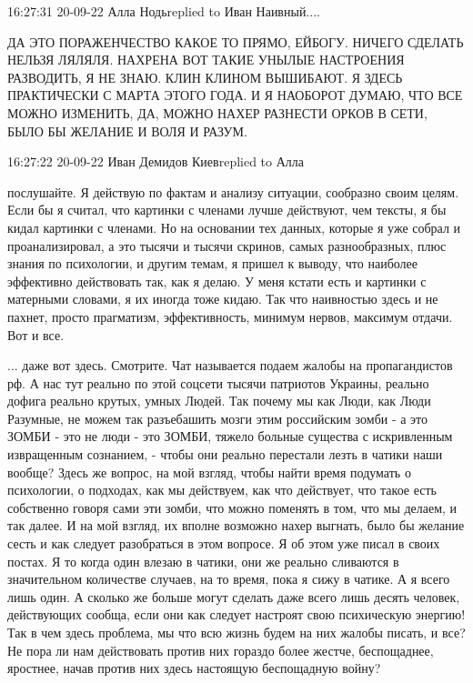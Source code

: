 

16:27:31 20-09-22
Алла Нодьreplied to Иван
Наивный....

ДА ЭТО ПОРАЖЕНЧЕСТВО КАКОЕ ТО ПРЯМО, ЕЙБОГУ. НИЧЕГО СДЕЛАТЬ НЕЛЬЗЯ ЛЯЛЯЛЯ.
НАХРЕНА ВОТ ТАКИЕ УНЫЛЫЕ НАСТРОЕНИЯ РАЗВОДИТЬ, Я НЕ ЗНАЮ. КЛИН КЛИНОМ ВЫШИБАЮТ.
Я ЗДЕСЬ ПРАКТИЧЕСКИ С МАРТА ЭТОГО ГОДА. И Я НАОБОРОТ ДУМАЮ, ЧТО ВСЕ МОЖНО
ИЗМЕНИТЬ, ДА, МОЖНО НАХЕР РАЗНЕСТИ ОРКОВ В СЕТИ, БЫЛО БЫ ЖЕЛАНИЕ И ВОЛЯ И
РАЗУМ.

16:27:22 20-09-22
Иван Демидов Киевreplied to Алла

послушайте. Я действую по фактам и анализу ситуации, сообразно своим целям.
Если бы я считал, что картинки с членами лучше действуют, чем тексты, я бы
кидал картинки с членами. Но на основании тех данных, которые я уже собрал и
проанализировал, а это тысячи и тысячи скринов, самых разнообразных, плюс
знания по психологии, и другим темам, я пришел к выводу, что наиболее
эффективно действовать так, как я делаю. У меня кстати есть и картинки с
матерными словами, я их иногда тоже кидаю. Так что наивностью здесь и не
пахнет, просто прагматизм, эффективность, минимум нервов, максимум отдачи. Вот
и все.

... даже вот здесь. Смотрите. Чат называется подаем жалобы на пропагандистов
рф. А нас тут реально по этой соцсети тысячи патриотов Украины, реально дофига
реально крутых, умных Людей. Так почему мы как Люди, как Люди Разумные, не
можем так разъебашить мозги этим российским зомби - а это ЗОМБИ - это не люди -
это ЗОМБИ, тяжело больные существа с искривленным извращенным сознанием, -
чтобы они реально перестали лезть в чатики наши вообще? Здесь же вопрос, на мой
взгляд, чтобы найти время подумать о психологии, о подходах, как мы действуем,
как что действует, что такое есть собственно говоря сами эти зомби, что можно
поменять в том, что мы делаем, и так далее. И на мой взгляд, их вполне возможно
нахер выгнать, было бы желание сесть и как следует разобраться в этом вопросе.
Я об этом уже писал в своих постах. Я то когда один влезаю в чатики, они же
реально сливаются в значительном количестве случаев, на то время, пока я сижу в
чатике. А я всего лишь один. А сколько же больше могут сделать даже всего лишь
десять человек, действующих сообща, если они как следует настроят свою
психическую энергию! Так в чем здесь проблема, мы что всю жизнь будем на них
жалобы писать, и все? Не пора ли нам действовать против них гораздо более
жестче, беспощаднее, яростнее, начав против них здесь настоящую беспощадную
войну?


